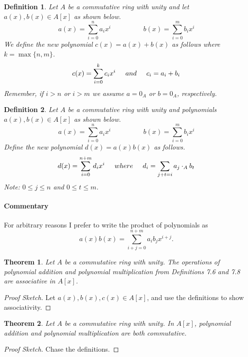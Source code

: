 \documentclass[letterpaper, 12pt]{article}
\newtheorem{defn}{Definition}
\newtheorem{thm}{Theorem}
\begin{document}
			\begin{defn}
			Let $A$ be a commutative ring with unity and let $a(x), b(x) \in A[x]$ as shown below. $$a(x) = \sum\limits_{i=0}^{n}a_{i}x^{i} \hspace{2cm} b(x) = \sum\limits_{i=0}^{m}b_{i}x^{i}$$
			We define the new polynomial $c(x) = a(x) + b(x)$ as follows where $k = \max\{ n,m \}$. $$c(x) = \sum\limits_{i=0}^{k}c_{i}x^{i} \hspace{5mm} and \hspace{5mm} c_{i}=a_{i}+b_{i}$$
			Remember, if $i > n$ or $i > m$ we assume $a = 0_{A}$ or $b = 0_{A}$, respectively.
			\end{defn}

			\setcounter{defn}{7}
			\begin{defn}
			Let $A$ be a commutative ring with unity and polynomials $a(x), b(x) \in A[x]$ as shown below. $$a(x) = \sum\limits_{i=0}^{n}a_{i}x^{i} \hspace{2cm} b(x) = \sum\limits_{i=0}^{m}b_{i}x^{i}$$
			Define the new polynomial $d(x) = a(x)b(x)$ as follows. $$d(x) = \sum\limits_{i=0}^{n+m}d_{i}x^{i} \hspace{5mm} where \hspace{5mm} d_{i} = \sum\limits_{j+t=i} a_{j} \cdot_{A} b_{t}$$
			Note: $0 \leq j \leq n$ and $0 \leq t \leq m$.
			\end{defn}
			\paragraph{\color{blue}Commentary}
			\color{blue} For arbitrary reasons I prefer to write the product of polynomials as $$a(x)b(x) = \sum\limits_{i+j = 0}^{n+m} a_{i}b_{j}x^{i+j}.$$
			\color{black}

			\setcounter{thm}{10}
			\begin{thm}
			Let $A$ be a commutative ring with unity. 
			The operations of polynomial addition and polynomial multiplication from Definitions 7.6 and 7.8 are associative in $A[x]$.
			\end{thm}
			\color{blue}
			\begin{proof}[Proof Sketch]
			Let $a(x),b(x),c(x) \in A[x]$, and use the definitions to show associativity.
			\end{proof}
			\color{black}

			\setcounter{thm}{12}
			\begin{thm}
			Let $A$ be a commutative ring with unity. 
			In $A[x]$, polynomial addition and polynomial multiplication are both commutative.
			\end{thm}
			\color{blue}
			\begin{proof}[Proof Sketch]
			Chase the definitions.
			\end{proof}
			\color{black}
\end{document}

